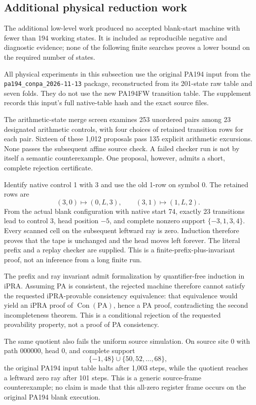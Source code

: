 \subsection{Additional physical reduction work}
The additional low-level work produced no accepted blank-start machine with
fewer than 194 working states. It is included as reproducible negative and
diagnostic evidence; none of the following finite searches proves a lower
bound on the required number of states.

All physical experiments in this subsection use the original PA194 input
from the \texttt{pa194\_conpa\_2026-11-13} package, reconstructed from its
201-state raw table and seven folds. They do not use the new PA194FW
transition table. The supplement records this input's full native-table
hash and the exact source files.

The arithmetic-state merge screen examines 253 unordered pairs among 23
designated arithmetic controls, with four choices of retained transition
rows for each pair. Sixteen of these 1,012 proposals pass 135 explicit
arithmetic excursions. None passes the subsequent affine source check.
A failed checker run is not by itself a semantic counterexample. One
proposal, however, admits a short, complete rejection certificate.

Identify native control 1 with 3 and use the old 1-row on symbol 0. The
retained rows are
\[
 (3,0)\longmapsto(0,L,3),\qquad
 (3,1)\longmapsto(1,L,2).
\]
From the actual blank configuration with native start 74, exactly 23
transitions lead to control 3, head position $-5$, and complete nonzero
support $\{-3,1,3,4\}$. Every scanned cell on the subsequent leftward
ray is zero. Induction therefore proves that the tape is unchanged and
the head moves left forever. The literal prefix and a replay checker
are supplied. This is a finite-prefix-plus-invariant proof, not an
inference from a long finite run.

The prefix and ray invariant admit formalization by quantifier-free
induction in iPRA. Assuming PA is consistent, the rejected machine
therefore cannot satisfy the requested iPRA-provable consistency
equivalence: that equivalence would yield an iPRA proof of
$\operatorname{Con}(\mathrm{PA})$, hence a PA proof, contradicting
the second incompleteness theorem. This is a conditional rejection
of the requested provability property, not a proof of PA consistency.

The same quotient also fails the uniform source simulation. On source
site 0 with path $000000$, head 0, and complete support
\[
 \{-1,48\}\cup\{50,52,\ldots,68\},
\]
the original PA194 input table halts after 1,003 steps, while the quotient reaches
a leftward zero ray after 101 steps. This is a generic source-frame
counterexample; no claim is made that this all-zero register frame
occurs on the original PA194 blank execution.

